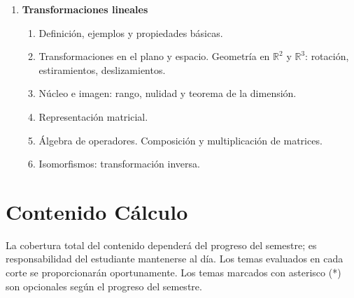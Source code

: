 \begin{enumerate}
\item \textbf{Transformaciones lineales}
\begin{enumerate}[$a)$]
\item Definición, ejemplos y propiedades básicas.
\item Transformaciones en el plano y espacio. Geometría en $\mathbb{R}^2$ y $\mathbb{R}^3$: rotación, estiramientos, deslizamientos.
\item Núcleo e imagen: rango, nulidad y teorema de la dimensión.
\item Representación matricial.
\item Álgebra de operadores. Composición y multiplicación de matrices.
\item Isomorfismos: transformación inversa.
\end{enumerate}
\end{enumerate}

\section{Contenido Cálculo}

La cobertura total del contenido dependerá del progreso del semestre; es responsabilidad del estudiante mantenerse al día. Los temas evaluados en cada corte se proporcionarán oportunamente. Los temas marcados con asterisco (*) son opcionales según el progreso del semestre.


